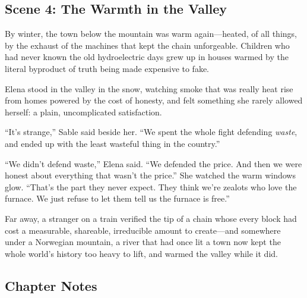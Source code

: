 \documentclass[12pt,letterpaper]{book}
\begin{document}
\hypertarget{scene-4-the-warmth-in-the-valley}{%
\subsection{Scene 4: The Warmth in the
Valley}\label{scene-4-the-warmth-in-the-valley}}

By winter, the town below the mountain was warm again---heated, of all things, by
the exhaust of the machines that kept the chain unforgeable. Children who had never
known the old hydroelectric days grew up in houses warmed by the literal byproduct
of truth being made expensive to fake.

Elena stood in the valley in the snow, watching smoke that was really heat rise
from homes powered by the cost of honesty, and felt something she rarely allowed
herself: a plain, uncomplicated satisfaction.

``It's strange,'' Sable said beside her. ``We spent the whole fight defending
\emph{waste}, and ended up with the least wasteful thing in the country.''

``We didn't defend waste,'' Elena said. ``We defended the price. And then we were
honest about everything that wasn't the price.'' She watched the warm windows
glow. ``That's the part they never expect. They think we're zealots who love the
furnace. We just refuse to let them tell us the furnace is free.''

Far away, a stranger on a train verified the tip of a chain whose every block had
cost a measurable, shareable, irreducible amount to create---and somewhere under a
Norwegian mountain, a river that had once lit a town now kept the whole world's
history too heavy to lift, and warmed the valley while it did.

\hypertarget{chapter-17-notes}{%
\subsection{Chapter Notes}\label{chapter-17-notes}}
\end{document}
